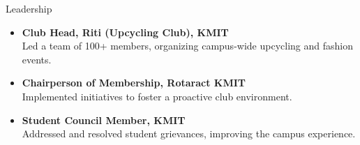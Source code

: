 \documentclass{resume} %
\begin{document}
\begin{rSection}{Leadership}
\begin{itemize}
    \item \textbf{Club Head, Riti (Upcycling Club), KMIT} \\
    Led a team of 100+ members, organizing campus-wide upcycling and fashion events.

    \item \textbf{Chairperson of Membership, Rotaract KMIT} \\
    Implemented initiatives to foster a proactive club environment.

    \item \textbf{Student Council Member, KMIT} \\
    Addressed and resolved student grievances, improving the campus experience.
\end{itemize}
\end{rSection}
\end{document}
